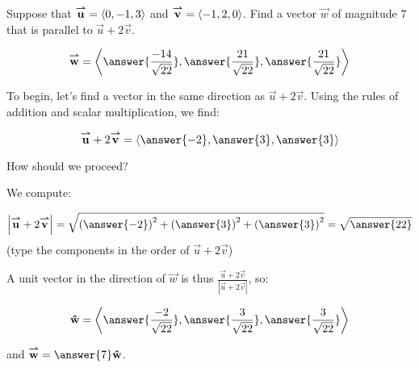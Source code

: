 \documentclass{ximera}
\author{Jim Talamo}
\begin{document}
\begin{exercise}
Suppose that ${\overset{\boldsymbol{\rightharpoonup}}{\mathbf{u}}} = \left\langle 0,-1,3\right\rangle$ and ${\overset{\boldsymbol{\rightharpoonup}}{\mathbf{v}}} = \left\langle -1,2,0\right\rangle$.  Find a vector $\vec{w}$ of magnitude $7$ that is parallel to $\vec{u}+2\vec{v}$.

\[
\vec{w} = \vector{\answer{\frac{-14}{\sqrt{22}} }, \answer{ \frac{21}{\sqrt{22}} } , \answer{ \frac{21}{\sqrt{22}} }}
\]

\begin{hint}
To begin, let's find a vector in the same direction as $\vec{u}+2\vec{v}$.  Using the rules of addition and scalar multiplication, we find:

\[
\vec{u}+2\vec{v} = \vector{\answer{-2} , \answer{3} , \answer{3}}
\]

How should we proceed?

\begin{multipleChoice}
\end{multipleChoice}

We compute:

\[
\left|\vec{u}+2\vec{v}\right| = \sqrt{\left( \answer{-2} \right)^2+\left(  \answer{3} \right)^2+\left(  \answer{3}\right)^2 }  = \sqrt{\answer{22}}
\]
(type the components in the order of $\vec{u}+2\vec{v}$)

A unit vector in the direction of $\vec{w}$ is thus $\frac{\vec{u}+2\vec{v}}{\left|\vec{u}+2\vec{v}\right|}$, so:

\[
\uvec{w} = \vector{\answer{\frac{-2}{\sqrt{22}} }, \answer{ \frac{3}{\sqrt{22}} } , \answer{ \frac{3}{\sqrt{22}} }}
\]

and  $\vec{w} = \answer{7} \uvec{w}$.
\end{hint}

\end{exercise}
\end{document}
